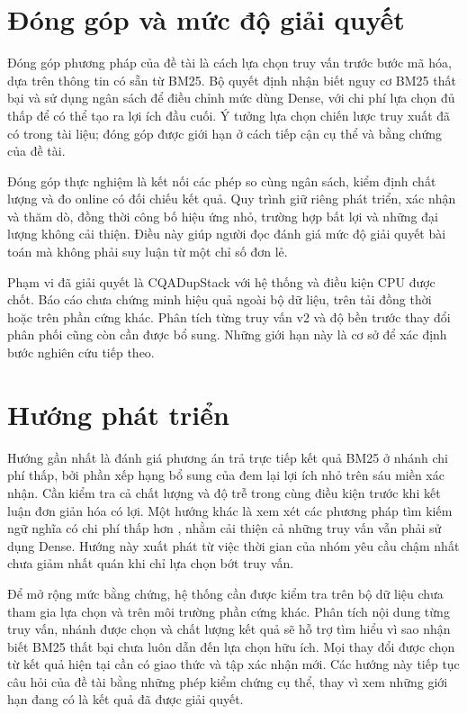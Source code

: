 \section{Đóng góp và mức độ giải quyết}
Đóng góp phương pháp của đề tài là cách lựa chọn truy vấn trước bước mã hóa, dựa trên thông tin có sẵn từ BM25. Bộ quyết định nhận biết nguy cơ BM25 thất bại và sử dụng ngân sách để điều chỉnh mức dùng Dense, với chi phí lựa chọn đủ thấp để có thể tạo ra lợi ích đầu cuối. Ý tưởng lựa chọn chiến lược truy xuất đã có trong tài liệu; đóng góp được giới hạn ở cách tiếp cận cụ thể và bằng chứng của đề tài.

Đóng góp thực nghiệm là kết nối các phép so cùng ngân sách, kiểm định chất lượng và đo online có đối chiếu kết quả. Quy trình giữ riêng phát triển, xác nhận và thăm dò, đồng thời công bố hiệu ứng nhỏ, trường hợp bất lợi và những đại lượng không cải thiện. Điều này giúp người đọc đánh giá mức độ giải quyết bài toán mà không phải suy luận từ một chỉ số đơn lẻ.

Phạm vi đã giải quyết là CQADupStack với hệ thống và điều kiện CPU được chốt. Báo cáo chưa chứng minh hiệu quả ngoài bộ dữ liệu, trên tải đồng thời hoặc trên phần cứng khác. Phân tích từng truy vấn v2 và độ bền trước thay đổi phân phối cũng còn cần được bổ sung. Những giới hạn này là cơ sở để xác định bước nghiên cứu tiếp theo.

\section{Hướng phát triển}
Hướng gần nhất là đánh giá phương án trả trực tiếp kết quả BM25 ở nhánh chi phí thấp, bởi phần xếp hạng bổ sung của \Pstar{} đem lại lợi ích nhỏ trên sáu miền xác nhận. Cần kiểm tra cả chất lượng và độ trễ trong cùng điều kiện trước khi kết luận đơn giản hóa có lợi. Một hướng khác là xem xét các phương pháp tìm kiếm ngữ nghĩa có chi phí thấp hơn \cite{hnsw2020}, nhằm cải thiện cả những truy vấn vẫn phải sử dụng Dense. Hướng này xuất phát từ việc thời gian của nhóm yêu cầu chậm nhất chưa giảm nhất quán khi chỉ lựa chọn bớt truy vấn.

Để mở rộng mức bằng chứng, hệ thống cần được kiểm tra trên bộ dữ liệu chưa tham gia lựa chọn và trên môi trường phần cứng khác. Phân tích nội dung từng truy vấn, nhánh được chọn và chất lượng kết quả sẽ hỗ trợ tìm hiểu vì sao nhận biết BM25 thất bại chưa luôn dẫn đến lựa chọn hữu ích. Mọi thay đổi được chọn từ kết quả hiện tại cần có giao thức và tập xác nhận mới. Các hướng này tiếp tục câu hỏi của đề tài bằng những phép kiểm chứng cụ thể, thay vì xem những giới hạn đang có là kết quả đã được giải quyết.
